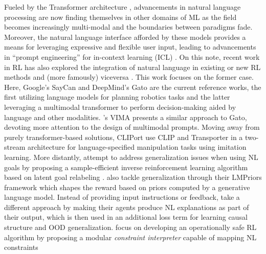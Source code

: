 \documentclass[../main.tex]{subfiles}
\begin{document}
Fueled by the Transformer architecture \citep{vaswani_attention_2017}, advancements in natural
language processing \citep{vaswani_attention_2017, devlin_bert_2019, brown_language_2020} are now
finding themselves in other domains of ML \citep{radford_learning_2021,
rombach_high-resolution_2022, dhariwal_jukebox_2020} as the field becomes increasingly multi-modal
\citep{baltrusaitis_multimodal_2019, xu_multimodal_2022} and the boundaries between paradigms fade.
Moreover, the natural language interface afforded by these models provides a means for leveraging
expressive and flexible user input, leading to advancements in ``prompt engineering'' for in-context
learning (ICL) \citep{dohan_language_2022, dosovitskiy_image_2022, reynolds_prompt_2021,
wei_chain--thought_2022, hertz_prompt--prompt_2022}. On this note, recent work in RL has also
explored the integration of natural language in existing or new RL methods
\citep{luketina_survey_2019} and (more famously) viceversa \citep{ouyang_training_2022}. This work
focuses on the former case. Here, Google's SayCan \citep{ahn_as_2022} and DeepMind's Gato
\citep{reed_generalist_2022} are the current reference works, the first utilizing language models
for planning robotics tasks and the latter leveraging a multimodal transformer to perform
decision-making aided by language and other modalities. 's VIMA presents
a similar approach to Gato, devoting more attention to the design of multimodal prompts. Moving away
from purely transformer-based solutions, CLIPort \citep{shridhar_cliport_2021} use CLIP
\citep{radford_learning_2021} and Transporter \citep{zeng_transporter_2021} in a two-stream
architecture for language-specified manipulation tasks using imitation learning. More distantly,
\citet{zhou_inverse_2021} attempt to address generalization issues when using NL goals by proposing
a sample-efficient inverse reinforcement learning algorithm based on latent goal relabeling
\citep{nair_visual_2018}.  also tackle generalization through their
LMPriors framework which shapes the reward \citep{ng_policy_1999} based on priors computed by
a generative language model. Instead of providing input instructions or feedback,
\citet{lampinen_tell_2022} take a different approach by making their agents produce NL explanations
as part of their output, which is then used in an additional loss term for learning causal structure
and OOD generalization.  focus on developing an operationally safe RL
algorithm by proposing a modular \textit{constraint interpreter} capable of mapping NL constraints
\end{document}
